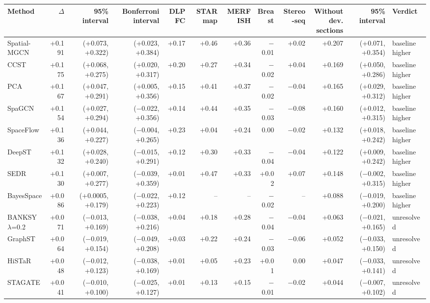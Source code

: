 \scriptsize
\begin{tabular}{lrrrrrrrrrrl}
\toprule
Method & $\Delta$ & 95\% interval & Bonferroni interval & DLPFC & STARmap & MERFISH & Breast & Stereo-seq & \shortstack{Without\\dev. sections} & 95\% interval & Verdict \\
\midrule
Spatial-MGCN & +0.191 & (+0.073, +0.322) & (+0.023, +0.384) & +0.17 & +0.46 & +0.36 & $-$0.01 & +0.02 & +0.207 & (+0.071, +0.354) & baseline higher \\
CCST & +0.175 & (+0.068, +0.275) & (+0.020, +0.317) & +0.20 & +0.27 & +0.34 & $-$0.02 & +0.04 & +0.169 & (+0.050, +0.286) & baseline higher \\
PCA & +0.167 & (+0.047, +0.291) & (+0.005, +0.356) & +0.15 & +0.41 & +0.37 & $-$0.02 & $-$0.04 & +0.165 & (+0.029, +0.312) & baseline higher \\
SpaGCN & +0.154 & (+0.027, +0.294) & ($-$0.022, +0.356) & +0.14 & +0.44 & +0.35 & $-$0.03 & $-$0.08 & +0.160 & (+0.012, +0.315) & baseline higher \\
SpaceFlow & +0.136 & (+0.044, +0.227) & ($-$0.004, +0.265) & +0.23 & +0.04 & +0.24 & 0.00 & $-$0.02 & +0.132 & (+0.018, +0.242) & baseline higher \\
DeepST & +0.132 & (+0.028, +0.240) & ($-$0.015, +0.291) & +0.12 & +0.30 & +0.33 & $-$0.04 & $-$0.04 & +0.122 & (+0.009, +0.242) & baseline higher \\
SEDR & +0.130 & (+0.007, +0.277) & ($-$0.039, +0.359) & +0.01 & +0.47 & +0.33 & +0.02 & +0.07 & +0.148 & ($-$0.002, +0.315) & baseline higher \\
BayesSpace & +0.086 & (+0.0005, +0.179) & ($-$0.022, +0.223) & +0.12 & -- & -- & $-$0.02 & -- & +0.088 & ($-$0.019, +0.200) & baseline higher \\
BANKSY $\lambda$=0.2 & +0.071 & ($-$0.013, +0.169) & ($-$0.038, +0.216) & +0.04 & +0.18 & +0.28 & $-$0.04 & $-$0.04 & +0.063 & ($-$0.021, +0.165) & unresolved \\
GraphST & +0.064 & ($-$0.019, +0.154) & ($-$0.049, +0.208) & +0.03 & +0.22 & +0.24 & $-$0.03 & $-$0.06 & +0.052 & ($-$0.033, +0.150) & unresolved \\
HiSTaR & +0.048 & ($-$0.012, +0.123) & ($-$0.038, +0.169) & +0.01 & +0.05 & +0.23 & +0.01 & 0.00 & +0.047 & ($-$0.033, +0.141) & unresolved \\
STAGATE & +0.041 & ($-$0.010, +0.100) & ($-$0.025, +0.127) & +0.01 & +0.13 & +0.15 & $-$0.01 & $-$0.02 & +0.044 & ($-$0.007, +0.102) & unresolved \\

\end{tabular}
